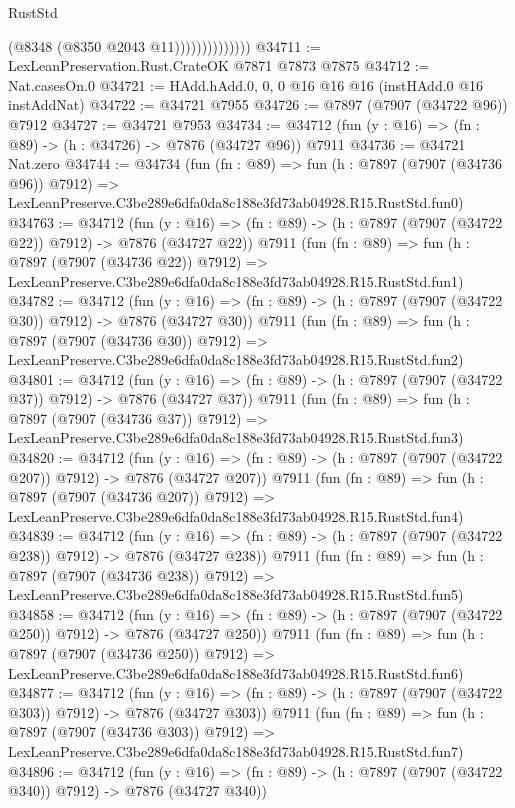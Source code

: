 \begin{lexlean}{RustStd}
\begin{coremodule}
                            (@8348 (@8350 @2043 @11))))))))))))))
@34711 := LexLeanPreservation.Rust.CrateOK @7871 @7873 @7875
@34712 := Nat.casesOn.{0}
@34721 := HAdd.hAdd.{0, 0, 0} @16 @16 @16 (instHAdd.{0} @16 instAddNat)
@34722 := @34721 @7955
@34726 := @7897 (@7907 (@34722 @96)) @7912
@34727 := @34721 @7953
@34734 := @34712 (fun (y : @16) => (fn : @89) -> (h : @34726) -> @7876 (@34727 @96)) @7911
@34736 := @34721 Nat.zero
@34744 := @34734
    (fun (fn : @89) =>
    fun (h : @7897 (@7907 (@34736 @96)) @7912) =>
    LexLeanPreserve.C3be289e6dfa0da8c188e3fd73ab04928.R15.RustStd.fun0)
@34763 := @34712
    (fun (y : @16) => (fn : @89) -> (h : @7897 (@7907 (@34722 @22)) @7912) -> @7876 (@34727 @22))
    @7911
    (fun (fn : @89) =>
    fun (h : @7897 (@7907 (@34736 @22)) @7912) =>
    LexLeanPreserve.C3be289e6dfa0da8c188e3fd73ab04928.R15.RustStd.fun1)
@34782 := @34712
    (fun (y : @16) => (fn : @89) -> (h : @7897 (@7907 (@34722 @30)) @7912) -> @7876 (@34727 @30))
    @7911
    (fun (fn : @89) =>
    fun (h : @7897 (@7907 (@34736 @30)) @7912) =>
    LexLeanPreserve.C3be289e6dfa0da8c188e3fd73ab04928.R15.RustStd.fun2)
@34801 := @34712
    (fun (y : @16) => (fn : @89) -> (h : @7897 (@7907 (@34722 @37)) @7912) -> @7876 (@34727 @37))
    @7911
    (fun (fn : @89) =>
    fun (h : @7897 (@7907 (@34736 @37)) @7912) =>
    LexLeanPreserve.C3be289e6dfa0da8c188e3fd73ab04928.R15.RustStd.fun3)
@34820 := @34712
    (fun (y : @16) => (fn : @89) -> (h : @7897 (@7907 (@34722 @207)) @7912) -> @7876 (@34727 @207))
    @7911
    (fun (fn : @89) =>
    fun (h : @7897 (@7907 (@34736 @207)) @7912) =>
    LexLeanPreserve.C3be289e6dfa0da8c188e3fd73ab04928.R15.RustStd.fun4)
@34839 := @34712
    (fun (y : @16) => (fn : @89) -> (h : @7897 (@7907 (@34722 @238)) @7912) -> @7876 (@34727 @238))
    @7911
    (fun (fn : @89) =>
    fun (h : @7897 (@7907 (@34736 @238)) @7912) =>
    LexLeanPreserve.C3be289e6dfa0da8c188e3fd73ab04928.R15.RustStd.fun5)
@34858 := @34712
    (fun (y : @16) => (fn : @89) -> (h : @7897 (@7907 (@34722 @250)) @7912) -> @7876 (@34727 @250))
    @7911
    (fun (fn : @89) =>
    fun (h : @7897 (@7907 (@34736 @250)) @7912) =>
    LexLeanPreserve.C3be289e6dfa0da8c188e3fd73ab04928.R15.RustStd.fun6)
@34877 := @34712
    (fun (y : @16) => (fn : @89) -> (h : @7897 (@7907 (@34722 @303)) @7912) -> @7876 (@34727 @303))
    @7911
    (fun (fn : @89) =>
    fun (h : @7897 (@7907 (@34736 @303)) @7912) =>
    LexLeanPreserve.C3be289e6dfa0da8c188e3fd73ab04928.R15.RustStd.fun7)
@34896 := @34712
    (fun (y : @16) => (fn : @89) -> (h : @7897 (@7907 (@34722 @340)) @7912) -> @7876 (@34727 @340))

\end{coremodule}
\end{lexlean}
